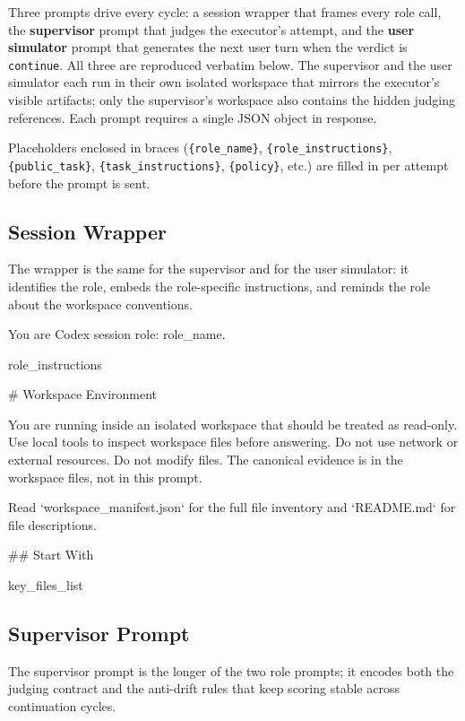 
Three prompts drive every cycle: a session wrapper that frames every
role call, the \textbf{supervisor} prompt that judges the executor's
attempt, and the \textbf{user simulator} prompt that generates the
next user turn when the verdict is \texttt{continue}. All three are
reproduced verbatim below. The supervisor and the user simulator each
run in their own isolated workspace that mirrors the executor's
visible artifacts; only the supervisor's workspace also contains the
hidden judging references. Each prompt requires a single JSON object
in response.

Placeholders enclosed in braces (\texttt{\{role\_name\}},
\texttt{\{role\_instructions\}}, \texttt{\{public\_task\}},
\texttt{\{task\_instructions\}}, \texttt{\{policy\}}, etc.) are
filled in per attempt before the prompt is sent.

\subsection{Session Wrapper}\label{app:prompts:wrapper}

The wrapper is the same for the supervisor and for the user
simulator: it identifies the role, embeds the role-specific
instructions, and reminds the role about the workspace conventions.

\begin{clawcode}[title={Session wrapper},label={lst:c:wrapper}]
You are Codex session role: {role_name}.

{role_instructions}

# Workspace Environment

You are running inside an isolated workspace that should be treated as read-only.
Use local tools to inspect workspace files before answering.
Do not use network or external resources. Do not modify files.
The canonical evidence is in the workspace files, not in this prompt.

Read `workspace_manifest.json` for the full file inventory and
`README.md` for file descriptions.

## Start With

{key_files_list}
\end{clawcode}

\subsection{Supervisor Prompt}\label{app:prompts:supervisor}

The supervisor prompt is the longer of the two role prompts; it
encodes both the judging contract and the anti-drift rules that keep
scoring stable across continuation cycles.

